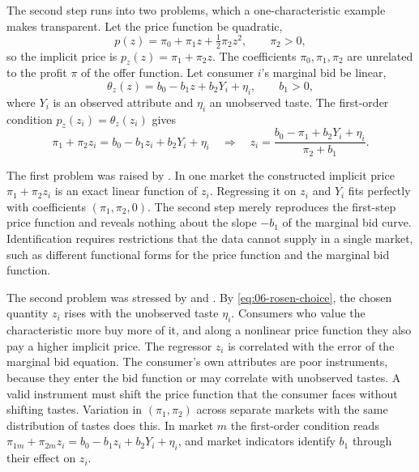 The second step runs into two problems, which a one-characteristic example makes transparent. Let the price function be
quadratic,
\begin{equation*}
  p(z) = \pi_0 + \pi_1 z + \tfrac{1}{2}\pi_2 z^2 , \qquad \pi_2 > 0 ,
\end{equation*}
so the implicit price is $p_z(z) = \pi_1 + \pi_2 z$. The coefficients $\pi_0, \pi_1, \pi_2$ are unrelated to the profit $\pi$ of the offer function. Let consumer $i$'s marginal bid be linear,
\begin{equation*}
  \theta_z(z) = b_0 - b_1 z + b_2 Y_i + \eta_i , \qquad b_1 > 0 ,
\end{equation*}
where $Y_i$ is an observed attribute and $\eta_i$ an unobserved taste. The first-order condition $p_z(z_i) = \theta_z(z_i)$
gives
\begin{equation}\label{eq:06-rosen-choice}
  \pi_1 + \pi_2 z_i = b_0 - b_1 z_i + b_2 Y_i + \eta_i
  \quad\Longrightarrow\quad
  z_i = \frac{b_0 - \pi_1 + b_2 Y_i + \eta_i}{\pi_2 + b_1} .
\end{equation}

The first problem was raised by \citet{BrownRosen1982}. In one market the constructed implicit price $\pi_1 + \pi_2 z_i$ is
an exact linear function of $z_i$. Regressing it on $z_i$ and $Y_i$ fits perfectly with coefficients $(\pi_1, \pi_2, 0)$. The
second step merely reproduces the first-step price function and reveals nothing about the slope $-b_1$ of the marginal bid
curve. Identification requires restrictions that the data cannot supply in a single market, such as different functional
forms for the price function and the marginal bid function.

The second problem was stressed by \citet{Epple1987} and \citet{Bartik1987}. By \eqref{eq:06-rosen-choice}, the chosen
quantity $z_i$ rises with the unobserved taste $\eta_i$. Consumers who value the characteristic more buy more of it, and
along a nonlinear price function they also pay a higher implicit price. The regressor $z_i$ is correlated with the error of
the marginal bid equation. The consumer's own attributes are poor instruments, because they enter the bid function or may
correlate with unobserved tastes. A valid instrument must shift the price function that the consumer faces without
shifting tastes. Variation in $(\pi_1, \pi_2)$ across separate markets with the same distribution of tastes does this. In
market $m$ the first-order condition reads $\pi_{1m} + \pi_{2m} z_i = b_0 - b_1 z_i + b_2 Y_i + \eta_i$, and market indicators
identify $b_1$ through their effect on $z_i$.

